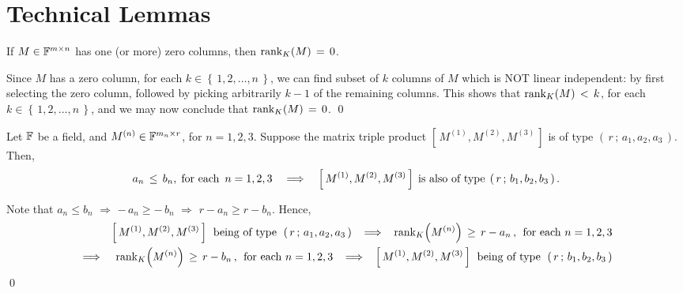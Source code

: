

\section{Technical Lemmas}
\setcounter{theorem}{0}
\setcounter{equation}{0}

\renewcommand{\theenumi}{\roman{enumi}}
\renewcommand{\labelenumi}{\textnormal{(\theenumi)}$\;\;$}

\begin{lemma}
\mbox{}\vskip 0.05cm
\noindent
If $M \in \mathbb{F}^{m \times n}$ has one (or more) zero columns, then $\textnormal{rank}_{K}\!\left(M\right) \,=\, 0$.
\end{lemma}
\proof
Since $M$ has a zero column, for each $k \in \left\{\,1,2,\ldots,n\,\right\}$, we can find subset of $k$
columns of $M$ which is NOT linear independent: by first selecting the zero column, followed by
picking arbitrarily $k-1$ of the remaining columns.
This shows that $\textnormal{rank}_{K}\!\left(M\right) \,<\, k$, for each $k \in \left\{\,1,2,\ldots,n\,\right\}$, and
we may now conclude that $\textnormal{rank}_{K}\!\left(M\right) \,=\, 0$.
\qed

\begin{lemma}
\mbox{}\vskip 0.05cm
\noindent
Let $\mathbb{F}$ be a field, and $M^{(n)} \in \mathbb{F}^{m_{n} \times r}$, for $n = 1,2,3$.
Suppose the matrix triple product $\left[\,M^{(1)},M^{(2)},M^{(3)}\,\right]$
is of type $\left(\,r\,;\,a_{1},a_{2},a_{3}\,\right)$. Then,
\begin{equation*}
a_{n} \,\leq\, b_{n}, \;\textnormal{for each \,$n = 1,2,3$}
\quad\Longrightarrow\quad
\left[\,M^{(1)},M^{(2)},M^{(3)}\,\right] \;\textnormal{is also of type}\; \left(\,r\,;\,b_{1},b_{2},b_{3}\,\right).
\end{equation*}
\end{lemma}
\proof
Note that\;
$a_{n} \leq b_{n}$ \;$\Longrightarrow$\; $-\,a_{n} \geq -\,b_{n}$ \;$\Longrightarrow$\; $r-a_{n} \geq r-b_{n}$.\;
Hence,
\begin{eqnarray*}
&& \textnormal{$\left[\,M^{(1)},M^{(2)},M^{(3)}\,\right]$\; being of type \;$\left(\,r\,;\,a_{1},a_{2},a_{3}\,\right)$}
\;\;\;\Longrightarrow\;\;\; \textnormal{rank}_{K}\!\left(M^{(n)}\right) \,\geq\, r - a_{n}\,, \;\,\textnormal{for each $n = 1,2,3$}
\\
&\Longrightarrow& \textnormal{rank}_{K}\!\left(M^{(n)}\right) \,\geq\, r - b_{n}\,, \;\,\textnormal{for each $n = 1,2,3$}
\;\;\;\Longrightarrow\;\;\; \textnormal{$\left[\,M^{(1)},M^{(2)},M^{(3)}\,\right]$\; being of type \;$\left(\,r\,;\,b_{1},b_{2},b_{3}\,\right)$}
\end{eqnarray*}
\qed

